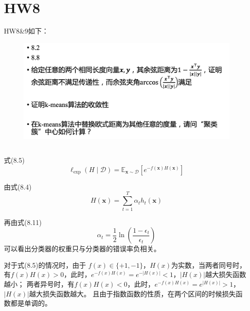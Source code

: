 \documentclass[UTF8,a4paper,AutoFakeBold,AutoFakeSlant]{article}
\begin{document}

\section{HW8}

HW8\&9如下：
\begin{figure}[htbp]
  \centering
  \includegraphics[scale=0.425]{hw8&9.png}
  \label{f8}
\end{figure}



\subsection{}

式(8.5)
\begin{equation*}
  \ell_{\exp }(H \mid \mathcal{D})=\mathbb{E}_{\boldsymbol{x} \sim \mathcal{D}}\left[e^{-f(\boldsymbol{x}) H(\boldsymbol{x})}\right]
\end{equation*}

由式(8.4)
\begin{equation*}
  H(\boldsymbol{x})=\sum_{t=1}^{T} \alpha_{t} h_{t}(\boldsymbol{x})
\end{equation*}

再由式(8.11)
\begin{equation*}
  \alpha_{t}=\frac{1}{2} \ln \left(\frac{1-\epsilon_{t}}{\epsilon_{t}}\right)
\end{equation*}
可以看出分类器的权重只与分类器的错误率负相关。

对于式(8.5)的情况时，由于 $ f(x) \in \{+1,-1\} $，$H(x)$为实数，当两者同号时，
有$f(x)H(x)>0$，此时，$e^{-f(x)H(x)} = e^{-|H(x)|} < 1$，$|H(x)|$越大损失函数越小；
两者异号时，有$f(x)H(x)<0$，此时，$e^{-f(x)H(x)} = e^{|H(x)|} > 1$，$|H(x)|$越大损失函数越大。
且由于指数函数的性质，在两个区间的时候损失函数都是单调的。
\end{document}
